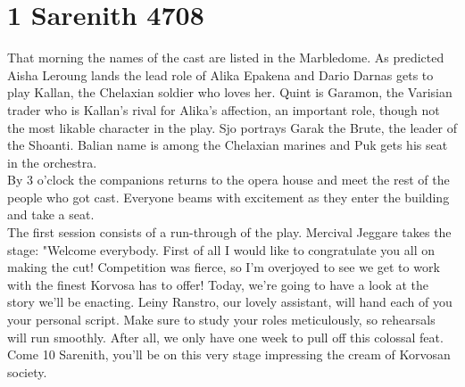 \section{1 Sarenith 4708}

That morning the names of the cast are listed in the Marbledome. As predicted Aisha Leroung lands the lead role of Alika Epakena and Dario Darnas gets to play Kallan, the Chelaxian soldier who loves her. Quint is Garamon, the Varisian trader who is Kallan's rival for Alika's affection, an important role, though not the most likable character in the play. Sjo portrays Garak the Brute, the leader of the Shoanti. Balian name is among the Chelaxian marines and Puk gets his seat in the orchestra.\\

By 3 o'clock the companions returns to the opera house and meet the rest of the people who got cast. Everyone beams with excitement as they enter the building and take a seat.\\

The first session consists of a run-through of the play. Mercival Jeggare takes the stage: "Welcome everybody. First of all I would like to congratulate you all on making the cut! Competition was fierce, so I'm overjoyed to see we get to work with the finest Korvosa has to offer! Today, we're going to have a look at the story we'll be enacting. Leiny Ranstro, our lovely assistant, will hand each of you your personal script. Make sure to study your roles meticulously, so rehearsals will run smoothly. After all, we only have one week to pull off this colossal feat. Come 10 Sarenith, you'll be on this very stage impressing the cream of Korvosan society.\\

